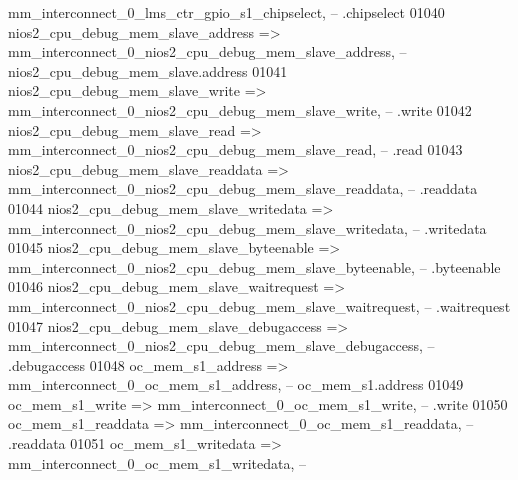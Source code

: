 \begin{DoxyCode}
      mm_interconnect_0_lms_ctr_gpio_s1_chipselect,\textcolor{keyword}{                --                                     
       .chipselect}
01040             nios2\_cpu\_debug\_mem\_slave\_address           => 
      mm_interconnect_0_nios2_cpu_debug_mem_slave_address,\textcolor{keyword}{         --            
       nios2\_cpu\_debug\_mem\_slave.address}
01041             nios2\_cpu\_debug\_mem\_slave\_write             => 
      mm_interconnect_0_nios2_cpu_debug_mem_slave_write,\textcolor{keyword}{           --                                      .write}
01042             nios2\_cpu\_debug\_mem\_slave\_read              => 
      mm_interconnect_0_nios2_cpu_debug_mem_slave_read,\textcolor{keyword}{            --                                      .read}
01043             nios2\_cpu\_debug\_mem\_slave\_readdata          => 
      mm_interconnect_0_nios2_cpu_debug_mem_slave_readdata,\textcolor{keyword}{        --                                     
       .readdata}
01044             nios2\_cpu\_debug\_mem\_slave\_writedata         => 
      mm_interconnect_0_nios2_cpu_debug_mem_slave_writedata,\textcolor{keyword}{       --                                     
       .writedata}
01045             nios2\_cpu\_debug\_mem\_slave\_byteenable        => 
      mm_interconnect_0_nios2_cpu_debug_mem_slave_byteenable,\textcolor{keyword}{      --                                     
       .byteenable}
01046             nios2\_cpu\_debug\_mem\_slave\_waitrequest       => 
      mm_interconnect_0_nios2_cpu_debug_mem_slave_waitrequest,\textcolor{keyword}{     --                                     
       .waitrequest}
01047             nios2\_cpu\_debug\_mem\_slave\_debugaccess       => 
      mm_interconnect_0_nios2_cpu_debug_mem_slave_debugaccess,\textcolor{keyword}{     --                                     
       .debugaccess}
01048             oc\_mem\_s1\_address                           => 
      mm_interconnect_0_oc_mem_s1_address,\textcolor{keyword}{                         --                            
       oc\_mem\_s1.address}
01049             oc\_mem\_s1\_write                             => 
      mm_interconnect_0_oc_mem_s1_write,\textcolor{keyword}{                           --                                      .write}
01050             oc\_mem\_s1\_readdata                          => 
      mm_interconnect_0_oc_mem_s1_readdata,\textcolor{keyword}{                        --                                     
       .readdata}
01051             oc\_mem\_s1\_writedata                         => 
      mm_interconnect_0_oc_mem_s1_writedata,\textcolor{keyword}{                       --                                     
}
\end{DoxyCode}

